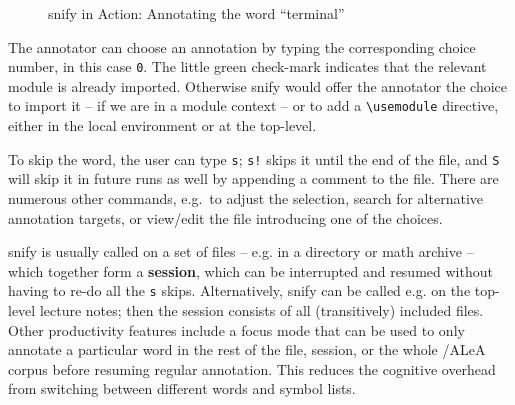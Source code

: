 \documentclass[runningheads]{llncs}
\newcommand\ALeA{\textsf{ALeA}\xspace}
\newcommand\snify{\textsf{snify}\xspace}
\begin{document}
\begin{figure}[ht]
  \setlength{\fboxsep}{0pt}
  \caption{\snify in Action: Annotating the word ``terminal''}\label{fig:snify}
\end{figure}

The annotator can choose an annotation by typing the corresponding choice number,
in this case \lstinline|0|.
The little green check-mark indicates that the relevant module is already imported.
Otherwise \snify would offer the annotator the choice to import it -- if we are
in a module context -- or to add a \lstinline|\usemodule| directive, either in the
local environment or at the top-level.

To skip the word, the user can type \lstinline|s|;
\lstinline|s!| skips it until the end of the file, and \lstinline|S|
will skip it in future runs as well by appending a comment to the file.
There are numerous other commands, e.g.\ to adjust the selection,
search for alternative annotation targets,
or view/edit the file introducing one of the choices.

\snify is usually called on a set of files -- e.g. in a directory or math archive -- which
together form a \textbf{session}, which can be interrupted and resumed without having to
re-do all the \lstinline|s| skips. Alternatively, \snify can be called e.g. on the
top-level lecture notes; then the session consists of all (transitively) included
files. Other productivity features include a focus mode that can be used to only annotate
a particular word in the rest of the file, session, or the whole \sTeX/\ALeA corpus before
resuming regular annotation. This reduces the cognitive overhead from switching between
different words and symbol lists.
\end{document}
